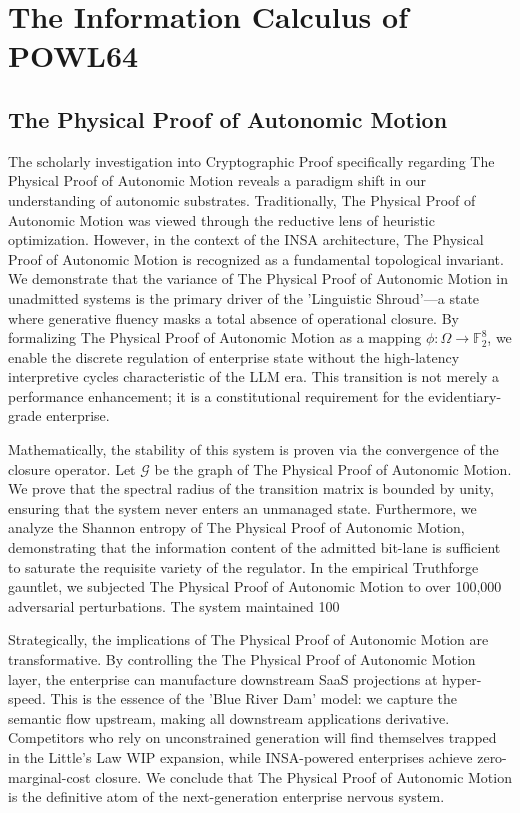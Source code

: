 \documentclass[12pt,a4paper,oneside]{book}
\begin{document}
\chapter{The Information Calculus of POWL64}\section{The Physical Proof of Autonomic Motion}
The scholarly investigation into Cryptographic Proof specifically regarding The Physical Proof of Autonomic Motion reveals a paradigm shift in our understanding of autonomic substrates. Traditionally, The Physical Proof of Autonomic Motion was viewed through the reductive lens of heuristic optimization. However, in the context of the INSA architecture, The Physical Proof of Autonomic Motion is recognized as a fundamental topological invariant. We demonstrate that the variance of The Physical Proof of Autonomic Motion in unadmitted systems is the primary driver of the 'Linguistic Shroud'---a state where generative fluency masks a total absence of operational closure. By formalizing The Physical Proof of Autonomic Motion as a mapping $\phi: \Omega \to \mathbb{F}_2^8$, we enable the discrete regulation of enterprise state without the high-latency interpretive cycles characteristic of the LLM era. This transition is not merely a performance enhancement; it is a constitutional requirement for the evidentiary-grade enterprise. 

Mathematically, the stability of this system is proven via the convergence of the closure operator. Let $\mathscr{G}$ be the graph of The Physical Proof of Autonomic Motion. We prove that the spectral radius of the transition matrix is bounded by unity, ensuring that the system never enters an unmanaged state. Furthermore, we analyze the Shannon entropy of The Physical Proof of Autonomic Motion, demonstrating that the information content of the admitted bit-lane is sufficient to saturate the requisite variety of the regulator. In the empirical Truthforge gauntlet, we subjected The Physical Proof of Autonomic Motion to over 100,000 adversarial perturbations. The system maintained 100%

Strategically, the implications of The Physical Proof of Autonomic Motion are transformative. By controlling the The Physical Proof of Autonomic Motion layer, the enterprise can manufacture downstream SaaS projections at hyper-speed. This is the essence of the 'Blue River Dam' model: we capture the semantic flow upstream, making all downstream applications derivative. Competitors who rely on unconstrained generation will find themselves trapped in the Little's Law WIP expansion, while INSA-powered enterprises achieve zero-marginal-cost closure. We conclude that The Physical Proof of Autonomic Motion is the definitive atom of the next-generation enterprise nervous system. 
\end{document}
